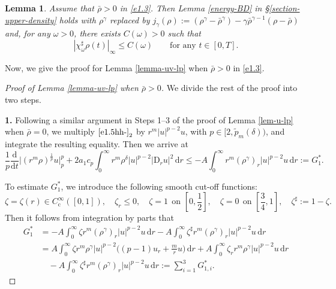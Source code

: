 \documentclass[11pt,reqno]{amsart}
\newtheorem{lem}{Lemma}[section]
\numberwithin{rk}{section}
\numberwithin{prop}{section}
\numberwithin{mydef}{section}
\numberwithin{lem}{section}
\numberwithin{equation}{section}
\numberwithin{thm}{section}
\begin{document}
\begin{lem}\label{lemma991}
Assume that $\bar{\rho}>0$ in \eqref{e1.3}. Then {\rm Lemma \ref{energy-BD}} in {\rm\S\ref{section-upper-density}} holds with $\rho^\gamma$ replaced by $j_\gamma(\rho):=(\rho^\gamma-\bar\rho^\gamma)-\gamma\bar\rho^{\gamma-1}(\rho-\bar\rho)$ and, for any $\omega>0$, there exists $C(\omega)>0$ such that
\begin{equation*}
|\chi^\sharp_\omega \rho(t)|_\infty\leq C(\omega)\qquad\text{for any $t\in [0,T]$}.
\end{equation*}
\end{lem}

Now, we give the proof for Lemma \ref{lemma-uv-lp} when $\bar\rho>0$ in \eqref{e1.3}.
\begin{proof}[Proof of Lemma \ref{lemma-uv-lp} when $\bar{\rho}>0$]

We divide the rest of the proof into two steps.

\smallskip
\textbf{1.} Following a similar argument in Steps 1--3 of the proof of Lemma \ref{lem-u-lp} when $\bar{\rho}=0$, we multiply $\eqref{e1.5hh-}_2$ by $r^m|u|^{p-2}u$, with $p\in [2,\tilde{p}_m(\delta))$, and integrate the resulting equality. Then we arrive at
\begin{equation}\label{4.172}
\frac{1}{p}\frac{\mathrm{d}}{\mathrm{d}t}\big|(r^m\rho)^\frac{1}{p}u\big|_p^p+2a_1 c_p\int_0^\infty r^m \rho^\delta |u|^{p-2}|\mathrm{D}_r u|^2\,\mathrm{d}r\leq -A\int_0^\infty r^m(\rho^\gamma)_r|u|^{p-2}u\,\mathrm{d}r:=G^*_1.
\end{equation}

To estimate $G^*_1$, we introduce the following smooth cut-off functions:
\begin{equation}\label{zzze}
\zeta=\zeta(r)\in C_{\mathrm{c}}^\infty([0,1]),\quad \zeta_r\leq 0,\quad  \zeta=1 \ \  \text{on $[0,\frac{1}{2}]$},\quad \zeta=0 \ \  \text{on $[\frac{3}{4},1]$},\quad \zeta^\sharp:=1-\zeta.
\end{equation}
Then it follows from integration by parts that
\begin{equation}\label{G1*}
\begin{aligned}
G^*_1&=-A\int_0^\infty \zeta r^m(\rho^\gamma)_r|u|^{p-2}u\,\mathrm{d}r-A\int_0^\infty \zeta^\sharp r^m(\rho^\gamma)_r|u|^{p-2}u\,\mathrm{d}r\\
&=A\int_0^\infty \zeta r^m \rho^\gamma |u|^{p-2}\big((p-1)u_r+\frac{m}{r}u\big)\,\mathrm{d}r+A\int_0^\infty \zeta_r r^m \rho^\gamma |u|^{p-2}u\,\mathrm{d}r\\
&\quad -A\int_0^\infty \zeta^\sharp r^m(\rho^\gamma)_r|u|^{p-2}u\,\mathrm{d}r:=\sum_{i=1}^3 G^*_{1,i}.
\end{aligned}
\end{equation}


\end{proof}
\end{document}
